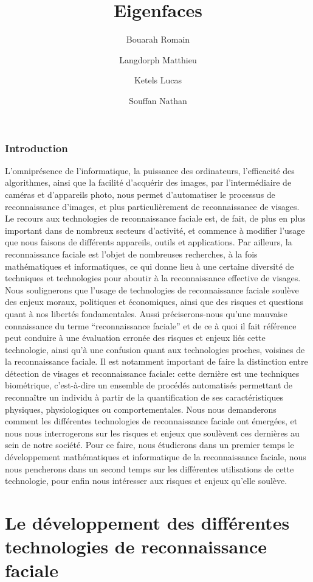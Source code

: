 \documentclass[12pt,french]{article}
\title{Eigenfaces}
\author{
  Bouarah Romain \and
  Langdorph Matthieu \and
  Ketels Lucas \and
  Souffan Nathan
}
\theoremstyle{plain}
\theoremstyle{definition}
\begin{document}
\maketitle
\newpage

\section*{Introduction}
L’omniprésence de l’informatique, la puissance des ordinateurs, l’efficacité des algorithmes, ainsi que la facilité d’acquérir des images, par l’intermédiaire de caméras et d’appareils photo, nous permet d’automatiser le processus de reconnaissance d’images, et plus particulièrement de reconnaissance de visages.
Le recours aux technologies de reconnaissance faciale est, de fait, de plus en plus important dans de nombreux secteurs d’activité, et commence à modifier l’usage que nous faisons de différents appareils, outils et applications.
Par ailleurs, la reconnaissance faciale est l’objet de nombreuses recherches, à la fois mathématiques et informatiques, ce qui donne lieu à une certaine diversité de techniques et technologies pour aboutir à la reconnaissance effective de visages.
Nous soulignerons que l’usage de technologies de reconnaissance faciale soulève des enjeux moraux, politiques et économiques, ainsi que des risques et questions quant à nos libertés fondamentales.
Aussi préciserons-nous qu’une mauvaise connaissance du terme “reconnaissance faciale” et de ce à quoi il fait référence peut conduire à une évaluation erronée des risques et enjeux liés cette technologie, ainsi qu’à une confusion quant aux technologies proches, voisines de la reconnaissance faciale.
Il est notamment important de faire la distinction entre détection de visages et reconnaissance faciale: cette dernière est une techniques biométrique, c’est-à-dire un ensemble de procédés automatisés permettant de reconnaître un individu à partir de la quantification de ses caractéristiques physiques, physiologiques ou comportementales.
Nous nous demanderons comment les différentes technologies de reconnaissance faciale ont émergées, et nous nous interrogerons sur les risques et enjeux que soulèvent ces dernières au sein de notre société.
Pour ce faire, nous étudierons dans un premier temps le développement mathématiques et informatique de la reconnaissance faciale, nous nous pencherons dans un second temps sur les différentes utilisations de cette technologie, pour enfin nous intéresser aux risques et enjeux qu’elle soulève.

\part{Le développement des différentes technologies de reconnaissance faciale}
\end{document}
